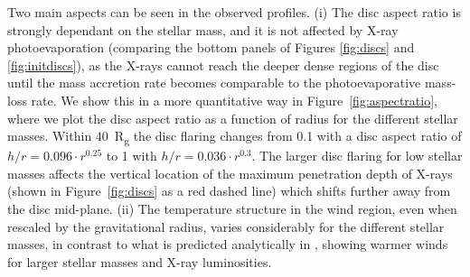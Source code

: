 \documentclass[usenatbib,useAMS,usedcolumn]{mnras}
\begin{document}
Two main aspects can be seen in the observed profiles. 
(i) The disc aspect ratio is strongly dependant on the stellar mass, and it is not affected by X-ray photoevaporation (comparing the bottom panels of Figures \ref{fig:discs} and \ref{fig:initdiscs}), as the X-rays cannot reach the deeper dense regions of the disc until the mass accretion rate becomes comparable to the photoevaporative mass-loss rate. We show this in a more quantitative way in Figure~\ref{fig:aspectratio}, where we plot the disc aspect ratio as a function of radius for the different stellar masses. Within \SI{40}{R_g} the disc flaring changes from \SI{0.1}{\solarmass} with a disc aspect ratio of $h/r = 0.096 \cdot r^{0.25}$ to \SI{1}{\solarmass} with $h/r = 0.036 \cdot r^{0.3}$. The larger disc flaring for low stellar masses affects the vertical location of the maximum penetration depth of X-rays (shown in Figure~\ref{fig:discs} as a red dashed line) which shifts further away from the disc mid-plane.
(ii) The temperature structure in the wind region, even when rescaled by the gravitational radius, varies considerably for the different stellar masses, in contrast to what is predicted analytically in , showing warmer winds for larger stellar masses and X-ray luminosities.
\end{document}
